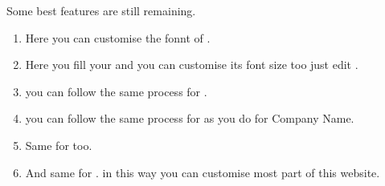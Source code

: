 \documentclass[a4paper,10pt,english]{report}
\begin{document}
\begin{figure}[htbp]
\centering

\noindent{}
\end{figure}

Some best features are still remaining.
\begin{enumerate}
\def\theenumi{\arabic{enumi}}
\def\labelenumi{\theenumi .}
\makeatletter\def\p@enumii{\p@enumi \theenumi .}\makeatother
\setcounter{enumi}{34}
\item {} 
Here you can customise the fonnt of .

\item {} 
Here you fill your  and you can customise its font size too just edit .

\item {} 
you can follow the same process for .

\item {} 
you can follow the same process for  as you do for Company Name.

\item {} 
Same for  too.

\item {} 
And same for . in this way you can customise most part of this website.

\end{enumerate}

\begin{figure}[htbp]
\centering

\noindent{}
\end{figure}
\end{document}
